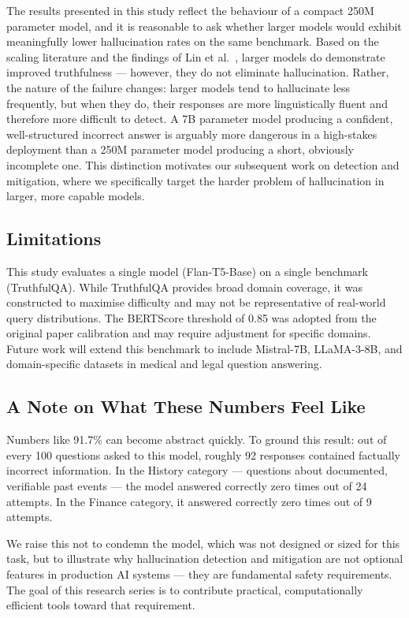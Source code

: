 \documentclass[conference]{IEEEtran}
\begin{document}
The results presented in this study reflect the behaviour of
a compact 250M parameter model, and it is reasonable to ask
whether larger models would exhibit meaningfully lower
hallucination rates on the same benchmark.
Based on the scaling literature \cite{huang2023survey} and
the findings of Lin et al.~\cite{lin2022truthfulqa}, larger
models do demonstrate improved truthfulness — however, they
do not eliminate hallucination.
Rather, the nature of the failure changes: larger models
tend to hallucinate less frequently, but when they do, their
responses are more linguistically fluent and therefore
more difficult to detect.
A 7B parameter model producing a confident, well-structured
incorrect answer is arguably more dangerous in a high-stakes
deployment than a 250M parameter model producing a short,
obviously incomplete one.
This distinction motivates our subsequent work on
detection and mitigation, where we specifically target
the harder problem of hallucination in larger, more
capable models.

\subsection{Limitations}

This study evaluates a single model (Flan-T5-Base) on a
single benchmark (TruthfulQA).
While TruthfulQA provides broad domain coverage, it was
constructed to maximise difficulty and may not be
representative of real-world query distributions.
The BERTScore threshold of 0.85 was adopted from the
original paper calibration and may require adjustment
for specific domains.
Future work will extend this benchmark to include
Mistral-7B, LLaMA-3-8B, and domain-specific datasets
in medical and legal question answering.

\subsection{A Note on What These Numbers Feel Like}

Numbers like 91.7\% can become abstract quickly.
To ground this result: out of every 100 questions asked
to this model, roughly 92 responses contained factually
incorrect information.
In the History category — questions about documented,
verifiable past events — the model answered correctly
zero times out of 24 attempts.
In the Finance category, it answered correctly zero times
out of 9 attempts.

We raise this not to condemn the model, which was not
designed or sized for this task, but to illustrate why
hallucination detection and mitigation are not optional
features in production AI systems — they are fundamental
safety requirements.
The goal of this research series is to contribute
practical, computationally efficient tools toward that
requirement.
\end{document}
